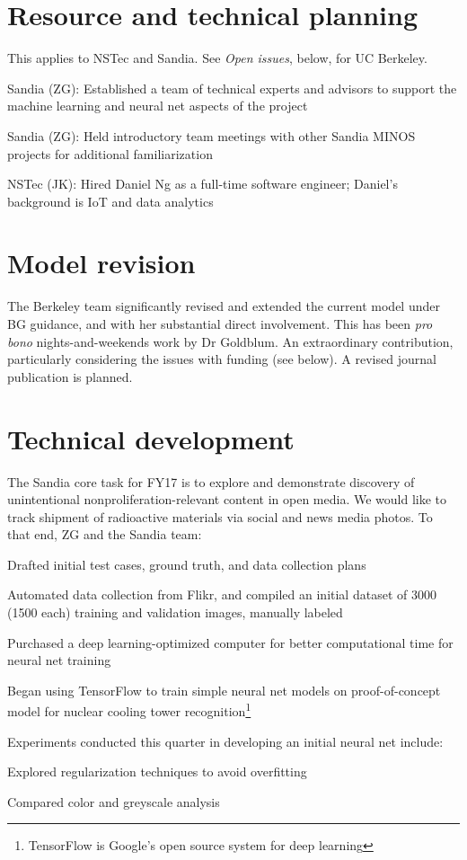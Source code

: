 \documentclass[11pt]{article} %
\begin{document}
\section{Resource and technical planning}
\noindent This applies to NSTec and Sandia. See \textit{Open issues}, below, for UC Berkeley.
\renewcommand\labelitemi{\tiny$\bullet$}
\begin{itemize*}
\item Sandia (ZG): Established a team of technical experts and advisors to support the machine learning and neural net aspects of the project
\item Sandia (ZG): Held introductory team meetings with other Sandia MINOS projects for additional familiarization
\item NSTec (JK): Hired Daniel Ng as a full-time software engineer; Daniel's background is IoT and data analytics
\end{itemize*}

\section{Model revision}
\noindent The Berkeley team significantly revised and extended the current model under BG guidance, and with her substantial direct involvement. This  has been \textit{pro bono} nights-and-weekends work by Dr Goldblum. An extraordinary contribution, particularly considering the issues with funding (see below). A revised journal publication is planned.

\section{Technical development}
\noindent The Sandia core task for FY17 is to explore and demonstrate discovery of unintentional nonproliferation-relevant content in open media. We would like to track shipment of radioactive materials via social and news media photos. To that end, ZG and the Sandia team:
\renewcommand\labelitemi{\tiny$\bullet$}
\begin{itemize*}
\item Drafted initial test cases, ground truth, and data collection plans
\item Automated data collection from Flikr, and compiled an initial dataset of 3000 (1500 each) training and validation images, manually labeled
\item Purchased a deep learning-optimized computer for better computational time for neural net training
\item Began using TensorFlow to train simple neural net models on proof-of-concept model for nuclear cooling tower recognition\footnote{TensorFlow is Google's open source system for deep learning}
\item Experiments conducted this quarter in developing an initial neural net include:
\begin{itemize*}
\item Explored regularization techniques to avoid overfitting
\item Compared color and greyscale analysis
\end{itemize*}
\end{itemize*}
\end{document}
